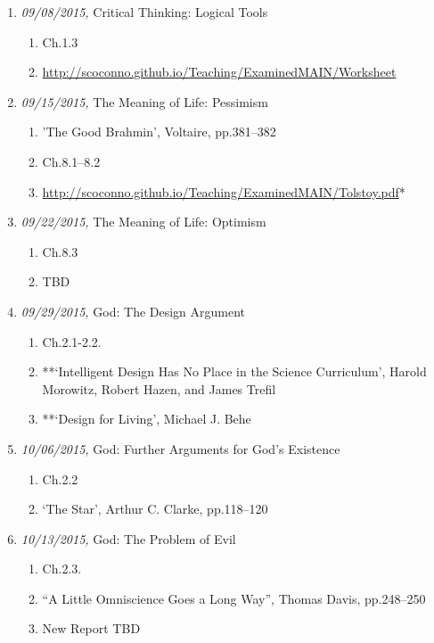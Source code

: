 \documentclass[11pt,article,oneside]{memoir}
\begin{document}
\begin{itemize}
{\begin{enumerate}
\item \textit{09/08/2015,} Critical Thinking: Logical Tools 
\begin{enumerate}
\item Ch.1.3
\item \href{**Handout}{http://scoconno.github.io/Teaching/ExaminedMAIN/Worksheet}
\end{enumerate}

\item \textit{09/15/2015,} The Meaning of Life: Pessimism 
\begin{enumerate}
\item 'The Good Brahmin', Voltaire, pp.381--382
\item Ch.8.1--8.2 
\item \href{**`A Confession', Leo Tolstoy (optional)}{http://scoconno.github.io/Teaching/ExaminedMAIN/Tolstoy.pdf}*
\end{enumerate}

\item \textit{09/22/2015,} The Meaning of Life: Optimism
\begin{enumerate}
\item Ch.8.3
\item TBD
\end{enumerate}

\item \textit{09/29/2015,} God: The Design Argument
\begin{enumerate}
\item Ch.2.1-2.2. 
\item **`Intelligent Design Has No Place in the Science Curriculum', Harold Morowitz, Robert Hazen, and James Trefil
 \item **`Design for Living', Michael J. Behe
 \end{enumerate}
 
\item \textit{10/06/2015,} God: Further Arguments for God's Existence
\begin{enumerate}
\item Ch.2.2
\item `The Star', Arthur C. Clarke, pp.118--120
\end{enumerate}

\item \textit{10/13/2015,} God: The Problem of Evil 
\begin{enumerate}
\item Ch.2.3.
\item ``A Little Omniscience Goes a Long Way'', Thomas Davis, pp.248--250
\item New Report TBD
\end{enumerate}


\end{enumerate}}
\end{itemize}
\end{document}

